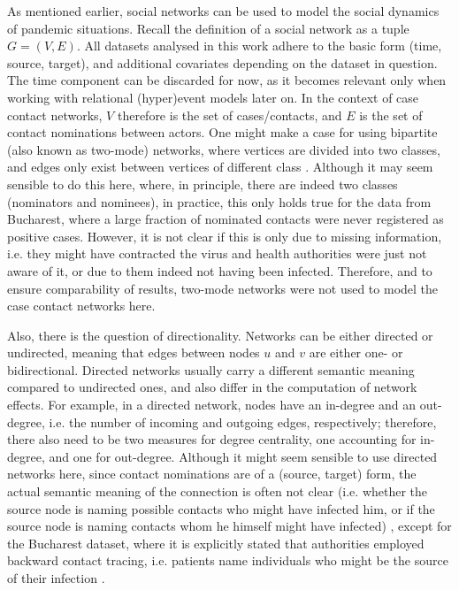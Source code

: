 As mentioned earlier, social networks can be used to model the social dynamics of pandemic situations. Recall the definition of a social network as a tuple $G = (V,E)$. All datasets analysed in this work adhere to the basic form (time, source, target), and additional covariates depending on the dataset in question. The time component can be discarded for now, as it becomes relevant only when working with relational (hyper)event models later on. In the context of case contact networks, $V$ therefore is the set of cases/contacts, and $E$ is the set of contact nominations between actors. One might make a case for using bipartite (also known as two-mode) networks, where vertices are divided into two classes, and edges only exist between vertices of different class \cite{borgatti1997network,latapy2008basic}. Although it may seem sensible to do this here, where, in principle, there are indeed two classes (nominators and nominees), in practice, this only holds true for the data from Bucharest, where a large fraction of nominated contacts were never registered as positive cases. However, it is not clear if this is only due to missing information, i.e. they might have contracted the virus and health authorities were just not aware of it, or due to them indeed not having been infected. Therefore, and to ensure comparability of results, two-mode networks were not used to model the case contact networks here. 

Also, there is the question of directionality. Networks can be either directed or undirected, meaning that edges between nodes $u$ and $v$ are either one- or bidirectional. Directed networks usually carry a different semantic meaning compared to undirected ones, and also differ in the computation of network effects. For example, in a directed network, nodes have an in-degree and an out-degree, i.e. the number of incoming and outgoing edges, respectively; therefore, there also need to be two measures for degree centrality, one accounting for in-degree, and one for out-degree. Although it might seem sensible to use directed networks here, since contact nominations are of a (source, target) form, the actual semantic meaning of the connection is often not clear (i.e. whether the source node is naming possible contacts who might have infected him, or if the source node is naming contacts whom he himself might have infected) \cite{kojaku2021effectiveness}, except for the Bucharest dataset, where it is explicitly stated that authorities employed backward contact tracing, i.e. patients name individuals who might be the source of their infection \cite{hancean2021role}.

